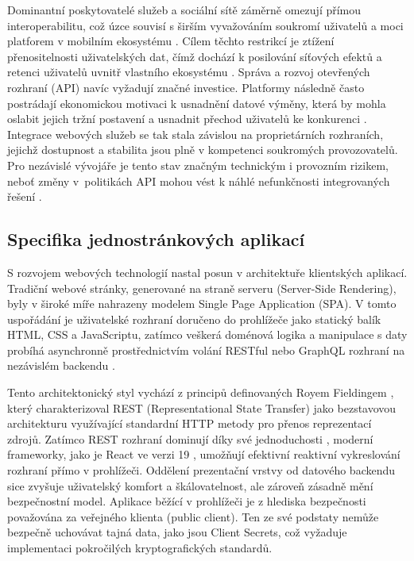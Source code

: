 \documentclass[male,czech,api_bc]{kitheses}
\begin{document}
Dominantní poskytovatelé služeb a sociální sítě záměrně omezují přímou interoperabilitu, což úzce souvisí s širším vyvažováním soukromí uživatelů a moci platforem v mobilním ekosystému \cite{Kramer2026}. Cílem těchto restrikcí je ztížení přenositelnosti uživatelských dat, čímž dochází k posilování síťových efektů a retenci uživatelů uvnitř vlastního ekosystému \cite{Marro2025}. Správa a rozvoj otevřených rozhraní (API) navíc vyžadují značné investice. Platformy následně často postrádají ekonomickou motivaci k usnadnění datové výměny, která by mohla oslabit jejich tržní postavení a usnadnit přechod uživatelů ke konkurenci \cite{Marro2025}. Integrace webových služeb se tak stala závislou na proprietárních rozhraních, jejichž dostupnost a stabilita jsou plně v kompetenci soukromých provozovatelů. Pro nezávislé vývojáře je tento stav značným technickým i provozním rizikem, neboť změny v~politikách API mohou vést k náhlé nefunkčnosti integrovaných řešení \cite{DeNardis2015}.

\subsection{Specifika jednostránkových aplikací}

S rozvojem webových technologií nastal posun v architektuře klientských aplikací. Tradiční webové stránky, generované na straně serveru (Server-Side Rendering), byly v široké míře nahrazeny modelem Single Page Application (SPA). V tomto uspořádání je uživatelské rozhraní doručeno do prohlížeče jako statický balík HTML, CSS a JavaScriptu, zatímco veškerá doménová logika a manipulace s daty probíhá asynchronně prostřednictvím volání RESTful nebo GraphQL rozhraní na nezávislém backendu \cite{Mudassir20241030}.

Tento architektonický styl vychází z principů definovaných Royem Fieldingem \cite{Fielding2000}, který charakterizoval REST (Representational State Transfer) jako bezstavovou architekturu využívající standardní HTTP metody pro přenos reprezentací zdrojů. Zatímco REST rozhraní dominují díky své jednoduchosti \cite{Mudassir20241030}, moderní frameworky, jako je React ve verzi 19 \cite{React20251023}, umožňují efektivní reaktivní vykreslování rozhraní přímo v prohlížeči. Oddělení prezentační vrstvy od datového backendu sice zvyšuje uživatelský komfort a škálovatelnost, ale zároveň zásadně mění bezpečnostní model. Aplikace běžící v prohlížeči je z hlediska bezpečnosti považována za veřejného klienta (public client). Ten ze své podstaty nemůže bezpečně uchovávat tajná data, jako jsou Client Secrets, což vyžaduje implementaci pokročilých kryptografických standardů.
\end{document}
